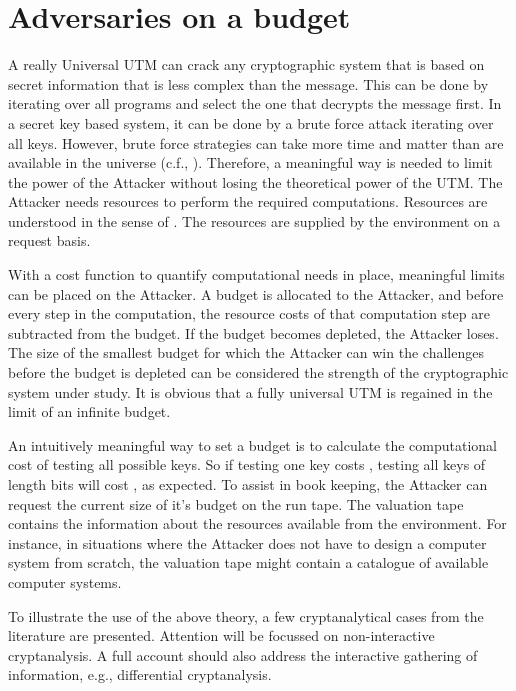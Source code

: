 \documentclass{article}
\begin{document}
\section{Adversaries on a budget}\label{SectBudget}

A really Universal UTM can crack any cryptographic system that is based on
secret information that is less complex than the message. This can be done by
iterating over all programs and select the one that decrypts the message first.
In a secret key based system, it can be done by a brute force attack iterating
over all keys. However, brute force strategies can take more time and matter
than are available in the universe (c.f.,
\cite{SLloyd-2000_Limits,SLloyd02_Capacity,SLloyd05_quant-ph0501135}).
Therefore, a meaningful way is needed to limit the power of the Attacker without
losing the theoretical power of the UTM. The Attacker needs resources to perform
the required computations. Resources are understood in the sense of
\cite{GiorgiJaparidze08012006,Son0911-5262}. The resources are supplied by 
the environment on a request basis.

With a cost function to quantify computational needs in place, meaningful limits
can be placed on the Attacker. A budget is allocated to the Attacker, and before
every step in the computation, the resource costs of that computation step are
subtracted from the budget. If the budget becomes depleted, the Attacker loses.
The size of the smallest budget for which the Attacker can win the challenges
before the budget is depleted can be considered the strength of the
cryptographic system under study. It is obvious that a fully universal UTM is
regained in the limit of an infinite budget.

An intuitively meaningful way to set a budget is to calculate the computational
cost of testing all possible keys. So if testing one key costs ,
testing all keys of length  bits will cost , as
expected. To assist in book keeping, the Attacker can request the current size
of it's budget on the run tape. The valuation tape contains the information about
the resources available from the environment. For instance, in situations where
the Attacker does not have to design a computer system from scratch, the
valuation tape might contain a catalogue of available computer systems.

To illustrate the use of the above theory, a few cryptanalytical cases from the
literature are presented. Attention will be focussed on non-interactive
cryptanalysis. A full account should also address the interactive gathering of
information, e.g., differential cryptanalysis.
\end{document}
